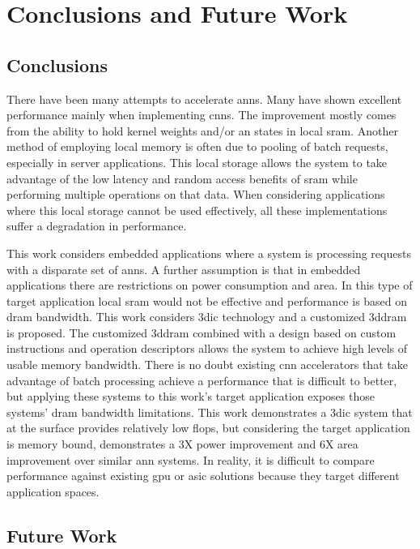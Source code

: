 
\chapter{Conclusions and Future Work}
\label{sec:Conclusions and Future Work}
\label{sec:chap-seven}

\section[Conclusions]{Conclusions}
\label{sec:Conclusions}

There have been many attempts to accelerate \acp{ann}. Many have shown excellent performance mainly when implementing \acp{cnn}. The improvement mostly comes from the ability to hold kernel weights and/or \ac{an} states in local \ac{sram}. 
Another method of employing local memory is often due to pooling of batch requests, especially in server applications.
This local storage allows the system to take advantage of the low latency and random access benefits of \ac{sram} while performing multiple operations on that data.
When considering applications where this local storage cannot be used effectively, all these implementations suffer a degradation in performance.

This work considers embedded applications where a system is processing requests with a disparate set of \acp{ann}. 
A further assumption is that in embedded applications there are restrictions on power consumption and area.
In this type of target application local \ac{sram} would not be effective and performance is based on \ac{dram} bandwidth.
This work considers \acf{3dic} technology and a customized \acf{3ddram} is proposed. 
The customized \ac{3ddram} combined with a design based on custom instructions and operation descriptors allows the system to achieve high levels of usable memory bandwidth.
There is no doubt existing \ac{cnn} accelerators that take advantage of batch processing achieve a performance that is difficult to better, but applying these systems to this work's target application exposes those systems' \ac{dram} bandwidth limitations.
This work demonstrates a \ac{3dic} system that at the surface provides relatively low \ac{flops}, but considering the target application is memory bound, demonstrates a 3X power improvement and 6X area improvement over similar \ac{ann} systems.
In reality, it is difficult to compare performance against existing \ac{gpu} or \ac{asic} solutions because they target different application spaces. 

\section[Future Work]{Future Work}
\label{sec:Future Work}

